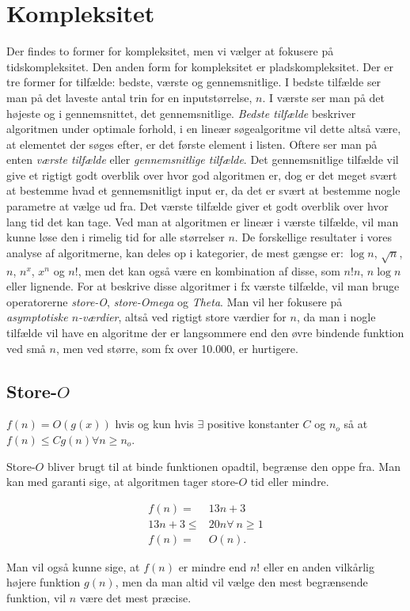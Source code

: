\section{Kompleksitet}

Der findes to former for kompleksitet, men vi vælger at fokusere på tidskompleksitet. Den anden form for kompleksitet er pladskompleksitet. 
Der er tre former for tilfælde: bedste, værste og gennemsnitlige. 
I bedste tilfælde ser man på det laveste antal trin for en inputstørrelse, $n$. I værste ser man på det højeste og i gennemsnittet, det gennemsnitlige. 
\emph{Bedste tilfælde} beskriver algoritmen under optimale forhold, i en lineær søgealgoritme vil dette altså være, at elementet der søges efter, er det første element i listen. 
Oftere ser man på enten \emph{værste tilfælde} eller \emph{gennemsnitlige tilfælde}. 
Det gennemsnitlige tilfælde vil give et rigtigt godt overblik over hvor god algoritmen er, dog er det meget svært at bestemme hvad et gennemsnitligt input er, da det er svært at bestemme nogle parametre at vælge ud fra. 
Det værste tilfælde giver et godt overblik over hvor lang tid det kan tage. Ved man at algoritmen er lineær i værste tilfælde, vil man kunne løse den i rimelig tid for alle størrelser $n$.
De forskellige resultater i vores analyse af algoritmerne, kan deles op i kategorier, de mest gængse er: $\log n$, $\sqrt{n}$, $n$, $n^x$, $x^n$ og $n!$, men det kan også være en kombination af disse, som $n!n$, $n\log n$ eller lignende.
For at beskrive disse algoritmer i fx værste tilfælde, vil man bruge operatorerne \emph{store-O}, \emph{store-Omega} og \emph{Theta}. Man vil her fokusere på \emph{asymptotiske $n$-værdier}, altså ved rigtigt store værdier for $n$, da man i nogle tilfælde vil have en algoritme der er langsommere end den øvre bindende funktion ved små $n$, men ved større, som fx over 10.000, er hurtigere.

\subsection{Store-$O$}
\begin{defn}
$f(n) = O(g(x))$ hvis og kun hvis $\exists$ positive konstanter $C$ og $n_o$ så at $f(n) \leq C g(n) \forall n \geq n_o$.
\end{defn}

Store-$O$ bliver brugt til at binde funktionen opadtil, begrænse den oppe fra. Man kan med garanti sige, at algoritmen tager store-$O$ tid eller mindre. 
\begin{exmp}
\begin{align*}
f(n)=& 13n+3 \\
13n+3 \leq& 20n \forall \ n \geq 1 \\
f(n) =& O(n).
\end{align*}
\end{exmp}
Man vil også kunne sige, at $f(n)$ er mindre end $n!$ eller en anden vilkårlig højere funktion $g(n)$, men da man altid vil vælge den mest begrænsende funktion, vil $n$ være det mest præcise. 

